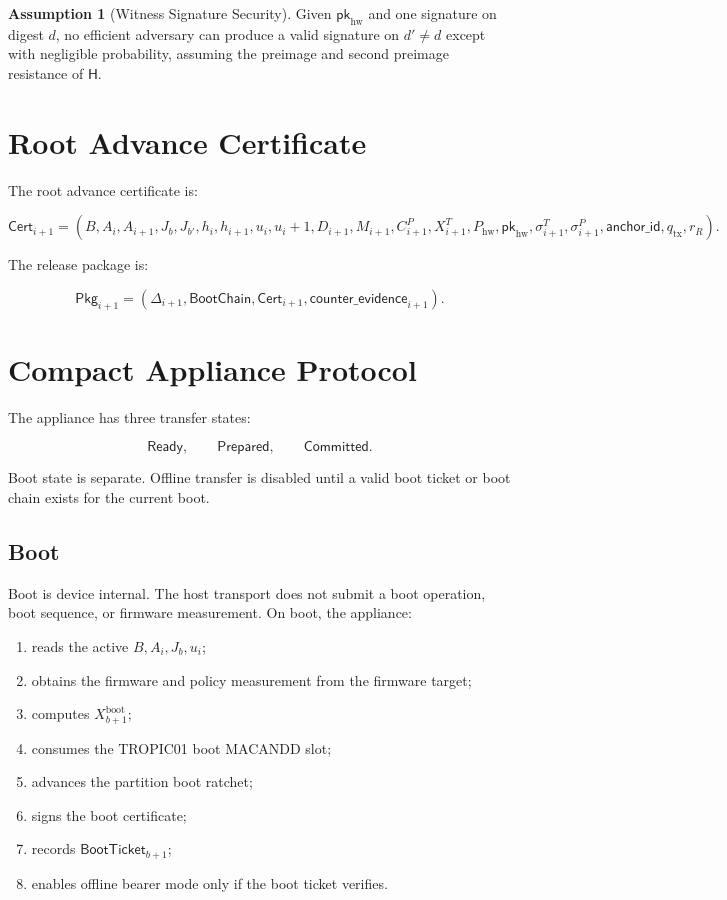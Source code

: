 \documentclass[11pt]{article}
\theoremstyle{definition}
\newtheorem{assumption}[theorem]{Assumption}
\theoremstyle{remark}
\newcommand{\Hf}{\ensuremath{\mathsf{H}}}
\newcommand{\Cert}{\ensuremath{\mathsf{Cert}}}
\newcommand{\Pkg}{\ensuremath{\mathsf{Pkg}}}
\newcommand{\Ready}{\ensuremath{\mathsf{Ready}}}
\newcommand{\Prepared}{\ensuremath{\mathsf{Prepared}}}
\newcommand{\Committed}{\ensuremath{\mathsf{Committed}}}
\newcommand{\Bundle}{\ensuremath{B}}
\newcommand{\Ahead}{\ensuremath{A}}
\newcommand{\Bhead}{\ensuremath{J}}
\newcommand{\BootTicket}{\ensuremath{\mathsf{BootTicket}}}
\newcommand{\BootChain}{\ensuremath{\mathsf{BootChain}}}
\newcommand{\pkhw}{\ensuremath{\mathsf{pk}_{\mathrm{hw}}}}
\newcommand{\pkh}{\ensuremath{P_{\mathrm{hw}}}}
\begin{document}
\begin{assumption}[Witness Signature Security]
Given \(\pkhw\) and one signature on digest \(d\), no efficient adversary can produce a valid
signature on \(d'\neq d\) except with negligible probability, assuming the preimage and second
preimage resistance of \(\Hf\).
\end{assumption}

\section{Root Advance Certificate}

The root advance certificate is:

\[
\Cert_{i+1}
=
(
\Bundle,
\Ahead_i,
\Ahead_{i+1},
\Bhead_b,
\Bhead_{b'},
h_i,
h_{i+1},
u_i,
u_i+1,
D_{i+1},
M_{i+1},
C^P_{i+1},
X^T_{i+1},
\pkh,
\pkhw,
\sigma^T_{i+1},
\sigma^P_{i+1},
\mathsf{anchor\_id},
q_{\mathrm{tx}},
r_R
).
\]

The release package is:

\[
\Pkg_{i+1}
=
(
\Delta_{i+1},
\BootChain,
\Cert_{i+1},
\mathsf{counter\_evidence}_{i+1}
).
\]

\section{Compact Appliance Protocol}

The appliance has three transfer states:

\[
\Ready,\qquad \Prepared,\qquad \Committed.
\]

Boot state is separate. Offline transfer is disabled until a valid boot ticket or boot chain exists
for the current boot.

\subsection{Boot}

Boot is device internal. The host transport does not submit a boot operation, boot sequence, or
firmware measurement. On boot, the appliance:

\begin{enumerate}[label=(\arabic*),leftmargin=2em]
\item reads the active \(\Bundle,\Ahead_i,\Bhead_b,u_i\);
\item obtains the firmware and policy measurement from the firmware target;
\item computes \(X^{\mathrm{boot}}_{b+1}\);
\item consumes the TROPIC01 boot MACANDD slot;
\item advances the partition boot ratchet;
\item signs the boot certificate;
\item records \(\BootTicket_{b+1}\);
\item enables offline bearer mode only if the boot ticket verifies.
\end{enumerate}
\end{document}
